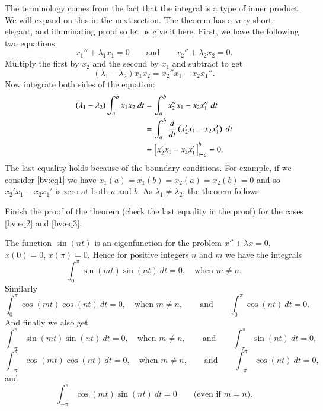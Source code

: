 \documentclass[12pt]{book}
\begin{document}
The terminology comes from the fact that the integral is a type of
inner product.  We will expand on this in the next section.  The theorem
has a very short, elegant, and illuminating proof so let us give it here.
First, we have the following two equations.
\begin{equation*}
x_1'' + \lambda_1 x_1 = 0
\qquad \text{and} \qquad
x_2'' + \lambda_2 x_2 = 0.
\end{equation*}
Multiply the first by $x_2$ and the second by $x_1$ and subtract to get
\begin{equation*}
(\lambda_1 - \lambda_2) x_1 x_2 = x_2'' x_1 - x_2 x_1'' .
\end{equation*}
Now integrate both sides of the equation:
\begin{equation*}
\begin{split}
(\lambda_1 - \lambda_2) \int_a^b x_1 x_2 ~dt
& =
\int_a^b x_2'' x_1 - x_2 x_1'' ~dt \\
& =
\int_a^b \frac{d}{dt} \left( x_2' x_1 - x_2 x_1' \right) ~dt \\
& =
\Bigl[ x_2' x_1 - x_2 x_1' \Bigr]_{t=a}^b
= 0 .
\end{split}
\end{equation*}
The last equality holds because of the boundary conditions.  For example, if
we consider \eqref{bv:eq1} we have $x_1(a) = x_1(b) = x_2(a) = x_2(b) = 0$
and so $x_2' x_1 - x_2 x_1'$ is zero at both $a$ and $b$.
As $\lambda_1 \not= \lambda_2$, the theorem follows.

\begin{exercise}[easy]
Finish the proof of the theorem (check the last equality in the proof) for the cases
\eqref{bv:eq2} and \eqref{bv:eq3}.
\end{exercise}

The function $\sin (n t)$ is an eigenfunction for the problem
$x''+\lambda x = 0$, $x(0) = 0$, $x(\pi) = 0$. 
Hence for positive
integers $n$ and $m$ we have the integrals
\begin{equation*}
\int_{0}^\pi \sin (mt) \sin (nt) ~dt = 0 ,
\quad
\text{when } m \not = n.
\end{equation*}
Similarly
\begin{equation*}
\int_{0}^\pi \cos (mt) \cos (nt) ~dt = 0 ,
\quad
\text{when } m \not = n,
\qquad \text{and} \qquad
\int_{0}^\pi  \cos (nt) ~dt = 0 .
\end{equation*}
And finally we also get
\begin{equation*}
\int_{-\pi}^\pi \sin (mt) \sin (nt) ~dt = 0 ,
\quad
\text{when } m \not = n, 
\qquad \text{and} \qquad
\int_{-\pi}^\pi  \sin (nt) ~dt = 0 ,
\end{equation*}
\begin{equation*}
\int_{-\pi}^\pi \cos (mt) \cos (nt) ~dt = 0 ,
\quad
\text{when } m \not = n,
\qquad \text{and} \qquad
\int_{-\pi}^\pi  \cos (nt) ~dt = 0 ,
\end{equation*}
and
\begin{equation*}
\int_{-\pi}^\pi \cos (mt) \sin (nt) ~dt = 0 
\qquad \text{(even if $m=n$).}
\end{equation*}
\end{document}
